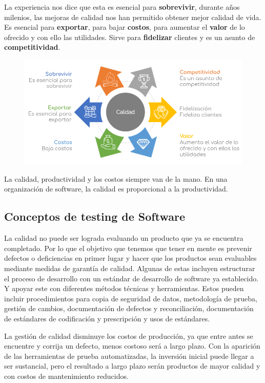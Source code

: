             La experiencia nos dice que esta es esencial para \textbf{sobrevivir}, durante años milenios, las mejoras de calidad nos han permitido obtener mejor calidad de vida. Es esencial para \textbf{exportar}, para bajar \textbf{costos}, para aumentar el \textbf{valor} de lo ofrecido y con ello las utilidades. Sirve para \textbf{fidelizar} clientes y es un asunto de \textbf{competitividad}.
            
            \begin{figure}[h]
                \centering
                \includegraphics[width=\textwidth]{imgs/2.png}
            \end{figure}
            
            La calidad, productividad y los costos siempre van de la mano. En una organización de software, la calidad es proporcional a la productividad.
    \subsection*{Conceptos de testing de Software}
    
    
    La calidad no puede ser lograda evaluando un producto que ya se encuentra completado. Por lo que el objetivo que tenemos que tener en mente es prevenir defectos o deficiencias en primer lugar y hacer que los productos sean evaluables mediante medidas de garantía de calidad. Algunas de estas incluyen estructurar el proceso de desarrollo con un estándar de desarrollo de software ya establecido. Y apoyar este con diferentes métodos técnicas y herramientas. Estos pueden incluir procedimientos para copia de seguridad de datos, metodología de prueba, gestión de cambios, documentación de defectos y reconciliación, documentación de estándares de codificación y prescripción y usos de estándares.
    
    La gestión de calidad disminuye los costos de producción, ya que entre antes se encuentre y corrija un defecto, menos costoso será a largo plazo. Con la aparición de las herramientas de prueba automatizadas, la inversión inicial puede llegar a ser sustancial, pero  el resultado a largo plazo serán productos de mayor calidad y con costos de mantenimiento reducidos.
    

